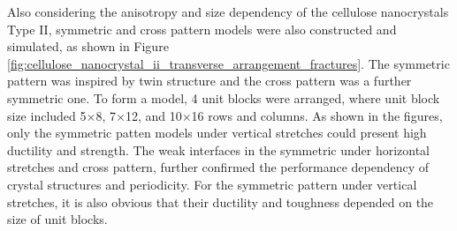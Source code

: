\documentclass{article}
\begin{document}
Also considering the anisotropy and size dependency of the cellulose nanocrystals Type II, symmetric and cross pattern models were also constructed and simulated, as shown in Figure \ref{fig:cellulose_nanocrystal_ii_transverse_arrangement_fractures}.
The symmetric pattern was inspired by twin structure and the cross pattern was a further symmetric one.
To form a model, 4 unit blocks were arranged, where unit block size included 5$\times$8, 7$\times$12, and 10$\times$16 rows and columns.
As shown in the figures, only the symmetric patten models under vertical stretches could present high ductility and strength.
The weak interfaces in the symmetric under horizontal stretches and cross pattern, further confirmed the performance dependency of crystal structures and periodicity.
For the symmetric pattern under vertical stretches, it is also obvious that their ductility and toughness depended on the size of unit blocks.
\end{document}
